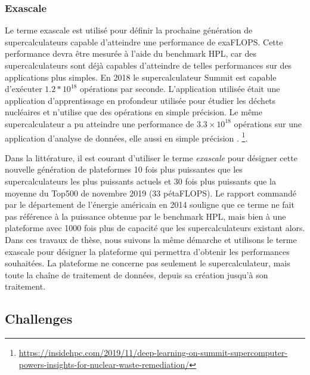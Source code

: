  
    \subsubsection{Exascale}\label{sec:exascale}
        
      
        
        Le terme \gls{exascale} est utilisé pour définir la prochaine génération de supercalculateurs capable d'atteindre une performance de \gls{exaFLOPS}. Cette performance devra être mesurée à l'aide du benchmark HPL, car des supercalculateurs sont déjà capables d'atteindre de telles performances sur des applications plus simples. En 2018 le supercalculateur Summit est capable d'exécuter $1.2 * 10^{18}$ opérations par seconde. L'application utilisée était une application d'apprentissage en profondeur utilisée pour étudier les déchets nucléaires et n'utilise que des opérations en simple précision. Le même supercalculateur a pu atteindre une performance de $3.3 \times 10^{18}$ opérations sur une application d'analyse de données, elle aussi en simple précision \cite{Bergman2018}.
         \footnote{\url{https://insidehpc.com/2019/11/deep-learning-on-summit-supercomputer-powers-insights-for-nuclear-waste-remediation/}}. 
        
        Dans la littérature, il est courant d'utiliser le terme \textit{exascale} pour désigner cette nouvelle génération de plateformes 10 fois plus puissantes que les supercalculateurs les plus puissants actuels et 30 fois plus puissants que la moyenne du Top500 de novembre 2019 (33 pétaFLOPS). Le rapport commandé par le département de l'énergie américain en 2014 \cite{Lucas2014} souligne que ce terme ne fait pas référence à la puissance obtenue par le benchmark HPL, mais bien à une plateforme avec 1000 fois plus de capacité que les supercalculateurs existant alors. Dans ces travaux de thèse, nous suivons la même démarche et utilisons le terme exascale pour désigner la plateforme qui permettra d'obtenir les performances souhaitées. La plateforme ne concerne pas seulement le supercalculateur, mais toute la chaîne de traitement de données, depuis sa création jusqu'à son traitement.


\subsection{Challenges}\label{sec:challenges}

